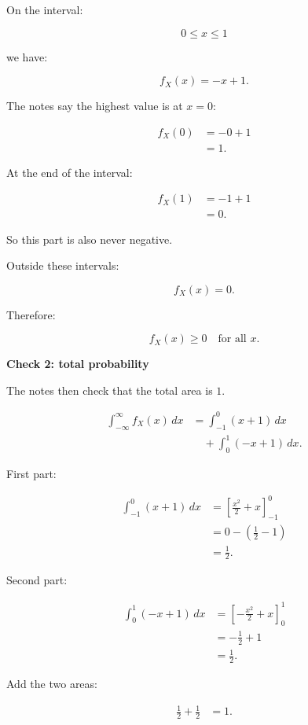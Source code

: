 \documentclass[10pt]{article}
\begin{document}
On the interval:

\[
0\le x\le 1
\]

we have:

\[
f_X(x)=-x+1.
\]

The notes say the highest value is at \(x=0\):

\begin{align*}
f_X(0)
&=-0+1 \\[2mm]
&=1.
\end{align*}

At the end of the interval:

\begin{align*}
f_X(1)
&=-1+1 \\[2mm]
&=0.
\end{align*}

So this part is also never negative.

Outside these intervals:

\[
f_X(x)=0.
\]

Therefore:

\[
f_X(x)\ge 0
\quad \text{for all }x.
\]

\textbf{Check 2: total probability}

The notes then check that the total area is \(1\).

\begin{align*}
\int_{-\infty}^{\infty} f_X(x)\,dx
&=
\int_{-1}^{0}(x+1)\,dx \\
&\quad+
\int_{0}^{1}(-x+1)\,dx.
\end{align*}

First part:

\begin{align*}
\int_{-1}^{0}(x+1)\,dx
&=
\left[
\frac{x^2}{2}+x
\right]_{-1}^{0} \\[2mm]
&=0-
\left(
\frac{1}{2}-1
\right) \\[2mm]
&=\frac{1}{2}.
\end{align*}

Second part:

\begin{align*}
\int_{0}^{1}(-x+1)\,dx
&=
\left[
-\frac{x^2}{2}+x
\right]_{0}^{1} \\[2mm]
&=
-\frac{1}{2}+1 \\[2mm]
&=\frac{1}{2}.
\end{align*}

Add the two areas:

\begin{align*}
\frac{1}{2}+\frac{1}{2}
&=1.
\end{align*}
\end{document}
